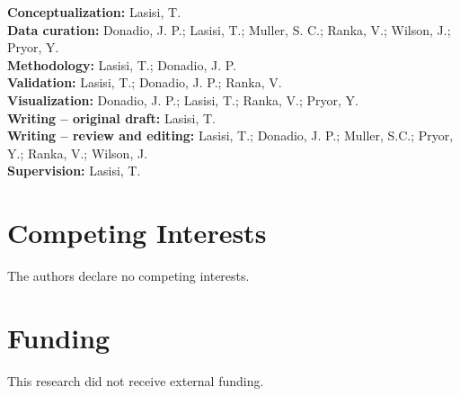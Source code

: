 \documentclass{article}
\begin{document}
\textbf{Conceptualization:} Lasisi, T. \\
\textbf{Data curation:} Donadio, J. P.; Lasisi, T.; Muller, S. C.; Ranka, V.; Wilson, J.; Pryor, Y. \\
\textbf{Methodology:} Lasisi, T.; Donadio, J. P. \\
\textbf{Validation:} Lasisi, T.; Donadio, J. P.; Ranka, V. \\
\textbf{Visualization:} Donadio, J. P.; Lasisi, T.; Ranka, V.; Pryor, Y. \\
\textbf{Writing -- original draft:} Lasisi, T. \\
\textbf{Writing -- review and editing:} Lasisi, T.; Donadio, J. P.; Muller, S.C.; Pryor, Y.; Ranka, V.; Wilson, J. \\
\textbf{Supervision:} Lasisi, T.

\section*{Competing Interests}

The authors declare no competing interests.

\section*{Funding}
This research did not receive external funding.



\end{document}
